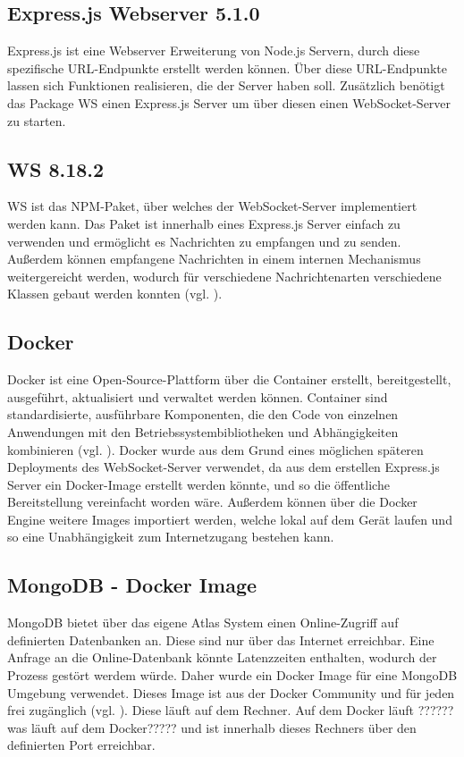\subsection{Express.js Webserver 5.1.0}
Express.js ist eine Webserver Erweiterung von Node.js Servern, durch diese spezifische \ac{URL}-Endpunkte erstellt werden können. Über diese \ac{URL}-Endpunkte lassen sich Funktionen realisieren, die der Server haben soll. Zusätzlich benötigt das Package WS einen Express.js Server um über diesen einen WebSocket-Server zu starten. 

\subsection{WS 8.18.2}
WS ist das \ac{NPM}-Paket, über welches der WebSocket-Server implementiert werden kann. Das Paket ist innerhalb eines Express.js Server einfach zu verwenden und ermöglicht es Nachrichten zu empfangen und zu senden. Außerdem können empfangene Nachrichten in einem internen Mechanismus weitergereicht werden, wodurch für verschiedene Nachrichtenarten verschiedene Klassen gebaut werden konnten (vgl. \citealp{websockets_websocketsws_2025}).

\subsection{Docker}
Docker ist eine Open-Source-Plattform über die Container erstellt, bereitgestellt, ausgeführt, aktualisiert und verwaltet werden können. Container sind standardisierte, ausführbare Komponenten, die den Code von einzelnen Anwendungen mit den Betriebssystembibliotheken und Abhängigkeiten kombinieren (vgl. \citealp{noauthor_was_2024}). Docker wurde aus dem Grund eines möglichen späteren Deployments des WebSocket-Server verwendet, da aus dem erstellen Express.js Server ein Docker-Image erstellt werden könnte, und so die öffentliche Bereitstellung vereinfacht worden wäre. Außerdem können über die Docker Engine weitere Images importiert werden, welche lokal auf dem Gerät laufen und so eine Unabhängigkeit zum Internetzugang bestehen kann.

\subsection{MongoDB - Docker Image}
MongoDB bietet über das eigene Atlas System einen Online-Zugriff auf definierten Datenbanken an. Diese sind nur über das Internet erreichbar. Eine Anfrage an die Online-Datenbank könnte Latenzzeiten enthalten, wodurch der Prozess gestört werdem würde. Daher wurde ein Docker Image für eine MongoDB Umgebung verwendet. Dieses Image ist aus der Docker Community und für jeden frei zugänglich (vgl. \citealp{noauthor_mongo_nodate}). Diese läuft auf dem Rechner. Auf dem Docker läuft ?????? was läuft auf dem Docker????? und ist innerhalb dieses Rechners über den definierten Port erreichbar.

